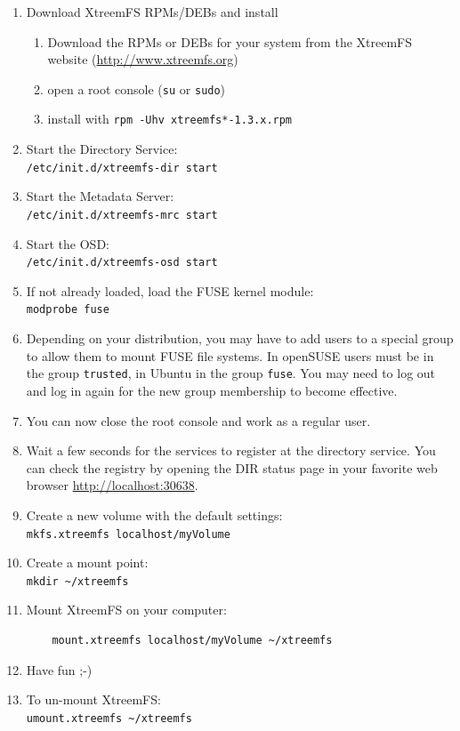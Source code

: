 \documentclass[a4paper,10pt]{book}
\begin{document}
\begin{enumerate}
 \item Download XtreemFS RPMs/DEBs and install
	\begin{enumerate}
		\item Download the RPMs or DEBs for your system from the XtreemFS website (\href{http://www.xtreemfs.org}{http://www.xtreemfs.org})
		\item open a root console (\texttt{su} or \texttt{sudo})
		\item install with \texttt{rpm -Uhv xtreemfs*-1.3.x.rpm}
	\end{enumerate}
\item Start the Directory Service:\\
	\texttt{/etc/init.d/xtreemfs-dir start}
\item Start the Metadata Server:\\
	\texttt{/etc/init.d/xtreemfs-mrc start}
\item Start the OSD:\\
	\texttt{/etc/init.d/xtreemfs-osd start}

\item If not already loaded, load the FUSE kernel module:\\
	\texttt{modprobe fuse}

\item Depending on your distribution, you may have to add users to a special group to allow them to mount FUSE file systems. In openSUSE users must be in the group \texttt{trusted}, in Ubuntu in the group \texttt{fuse}. You may need to log out and log in again for the new group membership to become effective.

\item You can now close the root console and work as a regular user.

\item Wait a few seconds for the services to register at the directory service. You can check the registry by opening the DIR status page in your favorite web browser \href{http://localhost:30638}{http://localhost:30638}.

\item Create a new volume with the default settings:\\
	\texttt{mkfs.xtreemfs localhost/myVolume}

\item Create a mount point:\\
	\texttt{mkdir \~{}/xtreemfs}

\item Mount XtreemFS on your computer:
	\begin{verbatim}
	mount.xtreemfs localhost/myVolume ~/xtreemfs
	\end{verbatim}


\item Have fun ;-)

\item To un-mount XtreemFS:\\
	\texttt{umount.xtreemfs \~{}/xtreemfs}
\end{enumerate}
\end{document}
